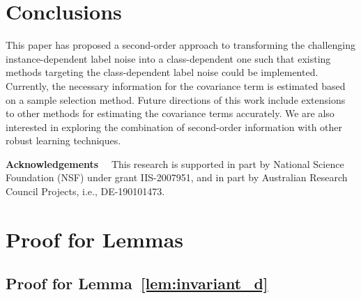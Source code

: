 \documentclass[final]{cvpr}
\begin{document}
 \section{Conclusions}
\vspace{-2pt}
This paper has proposed a second-order approach to transforming the challenging instance-dependent label noise into a class-dependent one such that existing methods targeting the class-dependent label noise could be implemented.
Currently, the necessary information for the covariance term is estimated based on a sample selection method.
Future directions of this work include extensions to other methods for estimating the covariance terms accurately.
We are also interested in exploring the combination of second-order information with other robust learning techniques.

\noindent\textbf{Acknowledgements}~~
This research is supported in part by National Science Foundation (NSF) under grant IIS-2007951, and in part by Australian Research Council Projects, i.e., DE-190101473.
 
\clearpage
\newpage




\clearpage
\newpage
\appendix
\onecolumn
{}

\section{Proof for Lemmas}



\subsection{Proof for Lemma~\ref{lem:invariant_d}}\label{proof:invariant_d}
\end{document}
